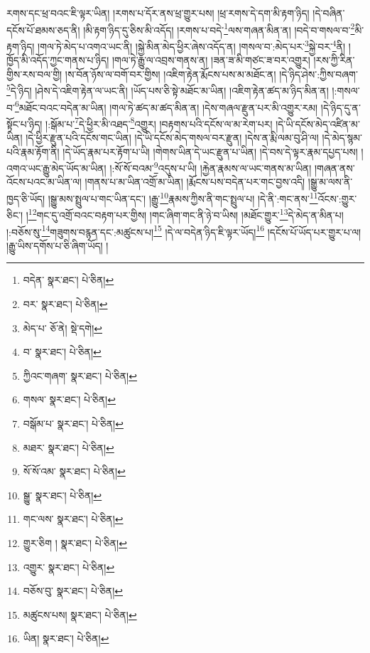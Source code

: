 རགས་དང་ཕྲ་བའང་ཇི་ལྟར་ཡིན། །རགས་པ་དོར་ནས་ཕྲ་གྱུར་པས། །ཕྲ་རགས་དེ་དག་མི་རྟག་ཉིད། །དེ་བཞིན་དངོས་པོ་ཐམས་ཅད་ནི། །མི་རྟག་ཉིད་དུ་ཅིས་མི་འདོད། །རགས་པ་བདེ་\footnote{བདེན་  སྣར་ཐང་།  པེ་ཅིན། }ལས་གཞན་མིན་ན། །བདེ་བ་གསལ་བ་\footnote{བར་  སྣར་ཐང་།  པེ་ཅིན། }མི་རྟག་ཉིད། །གལ་ཏེ་མེད་པ་འགའ་ཡང་ནི། །སྐྱེ་མིན་མེད་ཕྱིར་ཞེས་འདོད་ན། །གསལ་བ་:མེད་པར་\footnote{མེད་པ་  ཅོ་ནེ།  སྡེ་དགེ། }སྐྱེ་བར་\footnote{བ་  སྣར་ཐང་།  པེ་ཅིན། }ནི། །ཁྱོད་མི་འདོད་ཀྱང་གནས་པ་ཉིད། །གལ་ཏེ་རྒྱུ་ལ་འབྲས་གནས་ན། །ཟན་ཟ་མི་གཙང་ཟ་བར་འགྱུར། །རས་ཀྱི་རིན་གྱིས་རས་བལ་གྱི། །ས་བོན་ཉོས་ལ་བགོ་བར་གྱིས། །འཇིག་རྟེན་རྨོངས་པས་མ་མཐོང་ན། །དེ་ཉིད་ཤེས་:ཀྱིས་བཞག་\footnote{ཀྱིའང་གཞག་  སྣར་ཐང་།  པེ་ཅིན། }དེ་ཉིད། །ཤེས་དེ་འཇིག་རྟེན་ལ་ཡང་ནི། །ཡོད་པས་ཅི་སྟེ་མཐོང་མ་ཡིན། །འཇིག་རྟེན་ཚད་མ་ཉིད་མིན་ན། །:གསལ་བ་\footnote{གསལ་  སྣར་ཐང་།  པེ་ཅིན། }མཐོང་བའང་བདེན་མ་ཡིན། །གལ་ཏེ་ཚད་མ་ཚད་མིན་ན། །དེས་གཞལ་རྫུན་པར་མི་འགྱུར་རམ། །དེ་ཉིད་དུ་ན་སྟོང་པ་ཉིད། །:སྒོམ་པ་\footnote{བསྒོམ་པ་  སྣར་ཐང་།  པེ་ཅིན། }དེ་ཕྱིར་མི་འཐད་\footnote{མཐར་  སྣར་ཐང་།  པེ་ཅིན། }འགྱུར། །བརྟགས་པའི་དངོས་ལ་མ་རེག་པར། །དེ་ཡི་དངོས་མེད་འཛིན་མ་ཡིན། །དེ་ཕྱིར་རྫུན་པའི་དངོས་གང་ཡིན། །དེ་ཡི་དངོས་མེད་གསལ་བར་རྫུན། །དེས་ན་རྨི་ལམ་བུ་ཤི་ལ། །དེ་མེད་སྙམ་པའི་རྣམ་རྟོག་ནི། །དེ་ཡོད་རྣམ་པར་རྟོག་པ་ཡི། །གེགས་ཡིན་དེ་ཡང་རྫུན་པ་ཡིན། །དེ་བས་དེ་ལྟར་རྣམ་དཔྱད་པས། །འགའ་ཡང་རྒྱུ་མེད་ཡོད་མ་ཡིན། །:སོ་སོ་བའམ་\footnote{སོ་སོ་འམ་  སྣར་ཐང་།  པེ་ཅིན། }འདུས་པ་ཡི། །རྐྱེན་རྣམས་ལ་ཡང་གནས་མ་ཡིན། །གཞན་ནས་འོངས་པའང་མ་ཡིན་ལ། །གནས་པ་མ་ཡིན་འགྲོ་མ་ཡིན། །རྨོངས་པས་བདེན་པར་གང་བྱས་འདི། །སྒྱུ་མ་ལས་ནི་ཁྱད་ཅི་ཡོད། །སྒྱུ་མས་སྤྲུལ་པ་གང་ཡིན་དང་། །རྒྱུ་\footnote{སྒྱུ་  སྣར་ཐང་།  པེ་ཅིན། }རྣམས་ཀྱིས་ནི་གང་སྤྲུལ་པ། །དེ་ནི་:གང་ནས་\footnote{གང་ལས་  སྣར་ཐང་།  པེ་ཅིན། }འོངས་:གྱུར་ཅིང་། །\footnote{གྱུར་ཅིག །  སྣར་ཐང་།  པེ་ཅིན། }གང་དུ་འགྲོ་བའང་བརྟག་པར་གྱིས། །གང་ཞིག་གང་ནི་ཉེ་བ་ཡིས། །མཐོང་གྱུར་\footnote{འགྱུར་  སྣར་ཐང་།  པེ་ཅིན། }དེ་མེད་ན་མིན་པ། །:བཅོས་སུ་\footnote{བཅོས་བུ་  སྣར་ཐང་།  པེ་ཅིན། }གཟུགས་བརྙན་དང་:མཚུངས་པ།\footnote{མཚུངས་པས།  སྣར་ཐང་།  པེ་ཅིན། } །དེ་ལ་བདེན་ཉིད་ཇི་ལྟར་ཡོད།\footnote{ཡིན།  སྣར་ཐང་།  པེ་ཅིན། } །དངོས་པོ་ཡོད་པར་གྱུར་པ་ལ། །རྒྱུ་ཡིས་དགོས་པ་ཅི་ཞིག་ཡོད། །
